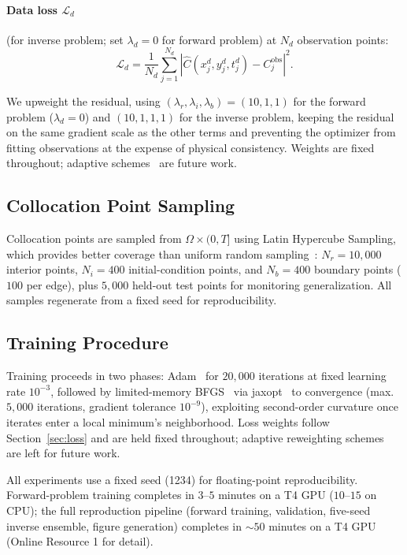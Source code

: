 \documentclass[pdflatex,sn-basic,Numbered]{sn-jnl}
\theoremstyle{thmstyleone}
\theoremstyle{thmstyletwo}
\begin{document}
\paragraph{Data loss $\mathcal{L}_d$} (for inverse problem;
set $\lambda_d = 0$ for forward problem) at $N_d$ observation
points:
\begin{equation}
  \mathcal{L}_d = \frac{1}{N_d} \sum_{j=1}^{N_d}
  \left| \hat{C}(x_j^d, y_j^d, t_j^d) - C_j^{\text{obs}} \right|^2.
  \label{eq:loss_d}
\end{equation}

We upweight the residual, using
$(\lambda_r, \lambda_i, \lambda_b) = (10, 1, 1)$ for the forward
problem ($\lambda_d = 0$) and $(10,1,1,1)$ for the inverse
problem, keeping the residual on the same gradient scale as the
other terms and preventing the optimizer from fitting
observations at the expense of physical consistency. Weights are
fixed throughout; adaptive schemes~\cite{Wang2021} are future
work.

\subsection{Collocation Point Sampling}
\label{sec:sampling}

Collocation points are sampled from $\Omega \times (0, T]$ using
Latin Hypercube Sampling, which provides better coverage than
uniform random sampling~\cite{McKay1979}: $N_r = 10{,}000$
interior points, $N_i = 400$ initial-condition points, and
$N_b = 400$ boundary points ($100$ per edge), plus $5{,}000$
held-out test points for monitoring generalization. All samples
regenerate from a fixed seed for reproducibility.

\subsection{Training Procedure}
\label{sec:training}

Training proceeds in two phases: Adam~\cite{Kingma2015} for
$20{,}000$ iterations at fixed learning rate $10^{-3}$, followed
by limited-memory BFGS~\cite{Liu1989} via
jaxopt~\cite{Blondel2022} to convergence (max.\ $5{,}000$
iterations, gradient tolerance $10^{-9}$), exploiting
second-order curvature once iterates enter a local minimum's
neighborhood. Loss weights follow Section~\ref{sec:loss} and
are held fixed throughout; adaptive reweighting
schemes~\cite{Wang2021} are left for future work.

All experiments use a fixed seed (1234) for floating-point
reproducibility. Forward-problem training completes in
$3$--$5$ minutes on a T4 GPU ($10$--$15$ on CPU); the full
reproduction pipeline (forward training, validation, five-seed
inverse ensemble, figure generation) completes in
$\sim 50$ minutes on a T4 GPU (Online Resource 1 for detail).
\end{document}
